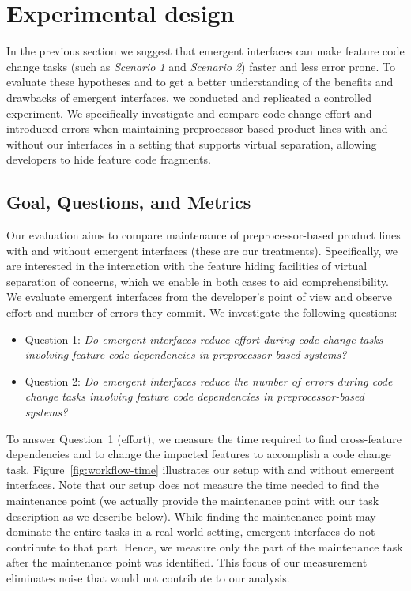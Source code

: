 
\section{Experimental design}

\label{sec:experimental-design}

In the previous section we suggest that emergent interfaces can make feature code change tasks (such as \textit{Scenario 1} and \textit{Scenario 2}) faster and less error prone. To evaluate these hypotheses and to get a better understanding of the benefits and drawbacks of emergent interfaces, we conducted and replicated a controlled experiment. We specifically investigate and compare code change effort and introduced errors when maintaining preprocessor-based product lines with and without our interfaces in a setting that supports virtual separation, allowing developers to hide feature code fragments.

\subsection{Goal, Questions, and Metrics}

Our evaluation aims to compare maintenance of preprocessor-based product lines with and without emergent interfaces (these are our treatments). Specifically, we are interested in the interaction with the feature hiding facilities of virtual separation of concerns, which we enable in both cases to aid comprehensibility. We evaluate emergent interfaces from the developer's point of view and observe effort and number of errors they commit. We investigate the following questions:

\begin{itemize}

	\item Question 1: \textit{Do emergent interfaces reduce effort during code change tasks involving feature code dependencies in preprocessor-based systems?}
	
	\item Question 2: \textit{Do emergent interfaces reduce the number of errors during code change tasks involving feature code dependencies in preprocessor-based systems?}

\end{itemize}

To answer Question~1 (effort), we measure the time required to find cross-feature dependencies and to change the impacted features to accomplish a code change task. Figure~\ref{fig:workflow-time} illustrates our setup with and without emergent interfaces.
Note that our setup does not measure the time needed to find the maintenance point (we actually provide the maintenance point with our task description as we describe below). While finding the maintenance point may dominate the entire tasks in a real-world setting, emergent interfaces do not contribute to that part. Hence, we measure only the part of the maintenance task after the maintenance point was identified. This focus of our measurement eliminates noise that would not contribute to our analysis. 

